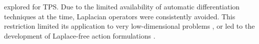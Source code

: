 explored for TPS. Due to the limited availability of automatic differentiation techniques at the time, Laplacian operators were consistently avoided. This restriction limited its application to very low-dimensional problems \cite{vanden2008geometric, 10.1063/1.3372802}, or led to the development of Laplace-free action formulations \cite{Lee2017}. 





